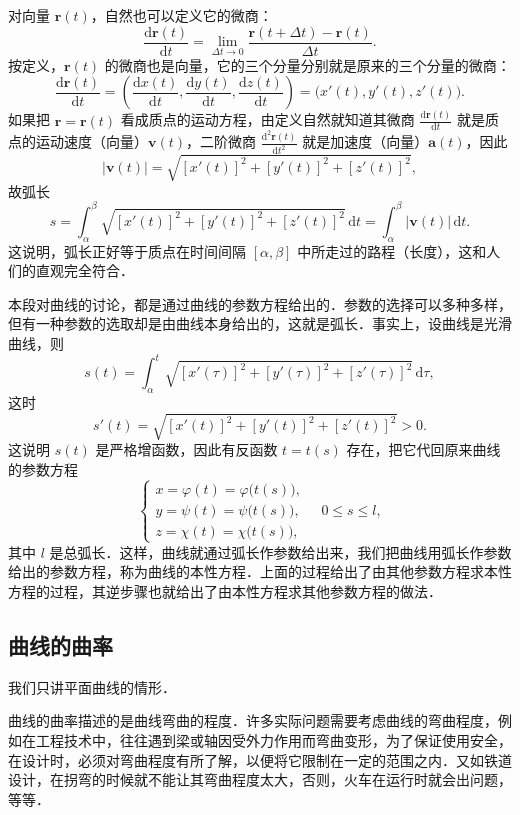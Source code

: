 对向量 $\boldsymbol{r}(t)$，自然也可以定义它的微商：
\[
\frac{\mathrm{d}\boldsymbol{r}(t)}{\mathrm{d}t} = \lim_{\Delta t\to 0}\frac{\boldsymbol{r}(t+\Delta t) - \boldsymbol{r}(t)}{\Delta t}.
\]
按定义，$\boldsymbol{r}(t)$ 的微商也是向量，它的三个分量分别就是原来的三个分量的微商：
\[
\frac{\mathrm{d}\boldsymbol{r}(t)}{\mathrm{d}t} = \left(\frac{\mathrm{d}x(t)}{\mathrm{d}t}, \frac{\mathrm{d}y(t)}{\mathrm{d}t}, \frac{\mathrm{d}z(t)}{\mathrm{d}t}\right) = \big(x'(t), y'(t), z'(t)\big).
\]
如果把 $\boldsymbol{r} = \boldsymbol{r}(t)$ 看成质点的运动方程，由定义自然就知道其微商 $\frac{\mathrm{d}\boldsymbol{r}(t)}{\mathrm{d}t}$ 就是质点的运动速度（向量）$\boldsymbol{v}(t)$，二阶微商 $\frac{\mathrm{d}^2\boldsymbol{r}(t)}{\mathrm{d}t^2}$ 就是加速度（向量）$\boldsymbol{a}(t)$，因此
\[
|\boldsymbol{v}(t)| = \sqrt{[x'(t)]^2 + [y'(t)]^2 + [z'(t)]^2},
\]
故弧长
\[
s = \int_\alpha^\beta \sqrt{[x'(t)]^2 + [y'(t)]^2 + [z'(t)]^2}\,\mathrm{d}t = \int_\alpha^\beta |\boldsymbol{v}(t)|\,\mathrm{d}t.
\]
这说明，弧长正好等于质点在时间间隔 $[\alpha,\beta]$ 中所走过的路程（长度），这和人们的直观完全符合．

本段对曲线的讨论，都是通过曲线的参数方程给出的．参数的选择可以多种多样，但有一种参数的选取却是由曲线本身给出的，这就是弧长．事实上，设曲线是光滑曲线，则
\[
s(t) = \int_\alpha^t \sqrt{[x'(\tau)]^2 + [y'(\tau)]^2 + [z'(\tau)]^2}\,\mathrm{d}\tau,
\]
这时
\[
s'(t) = \sqrt{[x'(t)]^2 + [y'(t)]^2 + [z'(t)]^2} > 0.
\]
这说明 $s(t)$ 是严格增函数，因此有反函数 $t = t(s)$ 存在，把它代回原来曲线的参数方程
\[
\begin{cases}
x = \varphi(t) = \varphi\big(t(s)\big), \\
y = \psi(t) = \psi\big(t(s)\big), \\
z = \chi(t) = \chi\big(t(s)\big),
\end{cases}
\quad 0 \leqslant s \leqslant l,
\]
其中 $l$ 是总弧长．这样，曲线就通过弧长作参数给出来，我们把曲线用弧长作参数给出的参数方程，称为曲线的本性方程．上面的过程给出了由其他参数方程求本性方程的过程，其逆步骤也就给出了由本性方程求其他参数方程的做法．


\subsection{曲线的曲率}\label{subsec:8-2-5}

我们只讲平面曲线的情形．

曲线的曲率描述的是曲线弯曲的程度．许多实际问题需要考虑曲线的弯曲程度，例如在工程技术中，往往遇到梁或轴因受外力作用而弯曲变形，为了保证使用安全，在设计时，必须对弯曲程度有所了解，以便将它限制在一定的范围之内．又如铁道设计，在拐弯的时候就不能让其弯曲程度太大，否则，火车在运行时就会出问题，等等．

